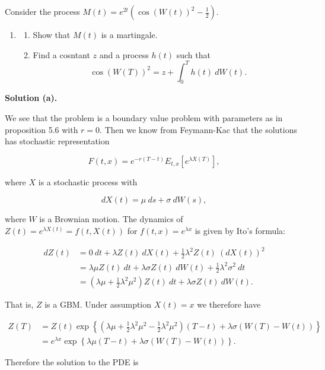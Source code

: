 \documentclass[
]{book}
\providecommand{\tightlist}{%
  \setlength{\itemsep}{0pt}\setlength{\parskip}{0pt}}
\begin{document}
Consider the process \(M(t)=e^{2t}\left(\cos(W(t))^2-\frac{1}{2}\right)\).

\begin{enumerate}
\def\labelenumi{\alph{enumi}.}
\setcounter{enumi}{2}
\item
  \begin{enumerate}
  \def\labelenumii{\roman{enumii}.}
  \tightlist
  \item
    Show that \(M(t)\) is a martingale.
  \item
    Find a cosntant \(z\) and a process \(h(t)\) such that
    \[
    \cos(W(T))^2=z+\int_0^T h(t)\ dW(t).
    \]
  \end{enumerate}
\end{enumerate}

\noindent\makebox[\linewidth]{\rule{\textwidth}{0.4pt}}

\textbf{Solution (a).}

We see that the problem is a boundary value problem with parameters as in proposition 5.6 with \(r=0\). Then we know from Feymann-Kac that the solutions has stochastic representation

\[
F(t,x)=e^{-r(T-t)}E_{t,x}[e^{\lambda X(T)}],
\]

where \(X\) is a stochastic process with

\[
dX(t)=\mu\ ds+\sigma\ dW(s),
\]

where \(W\) is a Brownian motion. The dynamics of \(Z(t)=e^{\lambda X(t)}=f(t,X(t))\) for \(f(t,x)=e^{\lambda x}\) is given by Ito's formula:

\begin{align*}
dZ(t)&=0\ dt+\lambda Z(t)\ dX(t)+\frac{1}{2}\lambda^2Z(t)\ (dX(t))^2\\
&=\lambda \mu Z(t)\ dt + \lambda \sigma Z(t)\ dW(t)+\frac{1}{2}\lambda^2\sigma^2\ dt\\
&=\left(\lambda\mu+\frac{1}{2}\lambda^2\mu^2\right)Z(t)\ dt + \lambda\sigma Z(t)\ dW(t).
\end{align*}

That is, \(Z\) is a GBM. Under assumption \(X(t)=x\) we therefore have

\begin{align*}
Z(T)&=Z(t)\exp\left\{\left(\lambda\mu+\frac{1}{2}\lambda^2\mu^2-\frac{1}{2}\lambda^2\mu^2\right)(T-t)+\lambda \sigma(W(T)-W(t))\right\}\\
&=e^{\lambda x}\exp\left\{\lambda\mu(T-t)+\lambda \sigma(W(T)-W(t))\right\}.
\end{align*}

Therefore the solution to the PDE is
\end{document}
